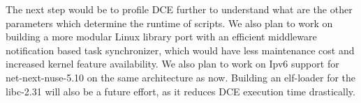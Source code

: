 \documentclass{sig-alternate}
\begin{document}
The next step would be to profile DCE further to understand what are the other parameters which determine 
the runtime of scripts. We also plan to work on building a more modular Linux library port with an efficient 
middleware notification based task synchronizer, which would have less maintenance cost and increased kernel feature availability.
 We also plan to work on Ipv6 support for net-next-nuse-5.10 on the same architecture as now. Building an elf-loader for the libc-2.31 will also be a 
future effort, as it reduces DCE execution time drastically.

%

%
%
\end{document}
